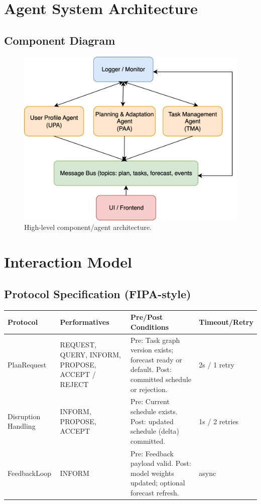 \documentclass[12pt,oneside]{report}
\begin{document}
\chapter{Agent System Architecture}
\section{Component Diagram}
\begin{figure}[h]
\centering
\includegraphics[width=1\textwidth]{Component Diagram.png}
\caption{High-level component/agent architecture.}
\label{fig:component-arch}
\end{figure}

\chapter{Interaction Model}
\section{Protocol Specification (FIPA-style)}
\begin{longtable}{@{}p{2.8cm}p{3.8cm}p{6.1cm}p{2.2cm}@{}}
\toprule
\textbf{Protocol} & \textbf{Performatives} & \textbf{Pre/Post Conditions} & \textbf{Timeout/Retry} \\
\midrule
PlanRequest & REQUEST, QUERY, INFORM, PROPOSE, ACCEPT / REJECT & Pre: Task graph version exists; forecast ready or default. Post: committed schedule or rejection. & 2s / 1 retry \\
Disruption Handling & INFORM, PROPOSE, ACCEPT & Pre: Current schedule exists. Post: updated schedule (delta) committed. & 1s / 2 retries \\
FeedbackLoop & INFORM & Pre: Feedback payload valid. Post: model weights updated; optional forecast refresh. & async \\
\bottomrule
\end{longtable}
\end{document}
